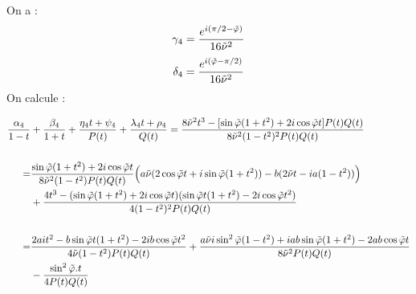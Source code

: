 On a :
$$\gamma_4=\frac{e^{i(\pi/2-\tilde{\varphi})}}{16\tilde{\nu}^2}$$
$$\delta_4=\frac{e^{i(\tilde{\varphi}-\pi/2)}}{16\tilde{\nu}^2}$$
On calcule :

\begin{equation*}
\begin{split}
\frac{\alpha_4}{1-t}&+\frac{\beta_4}{1+t}+\frac{\eta_4 t+\psi_4}{P(t)}+\frac{\lambda_4 t +\rho_4}{Q(t)}=\frac{8\tilde{\nu}^2t^3-\lbrack \sin\tilde{\varphi}(1+t^2)+2i\cos\tilde{\varphi} t \rbrack P(t)Q(t)}{8\tilde{\nu}^2(1-t^2)^2P(t)Q(t)} \\
~\\
=&\frac{\sin\tilde{\varphi}(1+t^2)+2i\cos\tilde{\varphi} t}{8\tilde{\nu}^2(1-t^2)P(t)Q(t)}\Big( a\tilde{\nu}(2\cos\tilde{\varphi}t+i\sin\tilde{\varphi}(1+t^2))-b(2\tilde{\nu} t-ia(1-t^2))\Big)\\
&+\frac{4t^3-(\sin\tilde{\varphi}(1+t^2)+2i\cos\tilde{\varphi} t)(\sin\tilde{\varphi}t(1+t^2)-2i\cos\tilde{\varphi} t^2)}{4(1-t^2)^2P(t)Q(t)}\\
~\\
=&\frac{2ait^2-b\sin\tilde{\varphi}t(1+t^2)-2ib\cos\tilde{\varphi}t^2}{4\tilde{\nu}(1-t^2)P(t)Q(t)}+\frac{a\tilde{\nu} i\sin^2\tilde{\varphi}(1-t^2)+iab\sin\tilde{\varphi}(1+t^2)-2ab\cos\tilde{\varphi}t}{8\tilde{\nu}^2P(t)Q(t)}\\
&-\frac{\sin^2\tilde{\varphi}.t}{4P(t)Q(t)}
\end{split}
\end{equation*}


